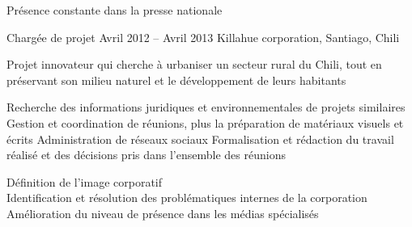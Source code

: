 \begin{joblist}
{\begin{itemize}
		\end{itemize}       
		 Présence constante dans la presse nationale
	}




\item[Chargée de projet]{Avril 2012 -- Avril 2013 }     
	{Killahue corporation, Santiago, Chili}     
	{
  
		 Projet innovateur qui cherche à urbaniser un secteur rural du Chili, tout en préservant son milieu naturel et le développement de leurs habitants \\
			 
		\iftbftiny \setlength{\parskip}{-10pt} \fi
		\begin{itemize}
			  \iftbftiny \setlength\itemsep{-3pt} \fi
			  \cvitem[\checkmark] Recherche des informations juridiques et environnementales de projets similaires          
			  \cvitem[\checkmark] Gestion et coordination de réunions, plus la préparation de matériaux visuels et écrits   
			  \cvitem[\checkmark] Administration de réseaux sociaux                                                                    
			  \cvitem[\checkmark] Formalisation et rédaction du travail réalisé et des décisions pris dans l’ensemble des réunions     
		\end{itemize}      

		  Définition de l’image corporatif \\
		\mission{}            Identification et résolution des problématiques internes de la corporation \\
		\mission{} 	      Amélioration du niveau de présence dans les médias spécialisés \\
	}
  
       

   

\end{joblist}


%
%


